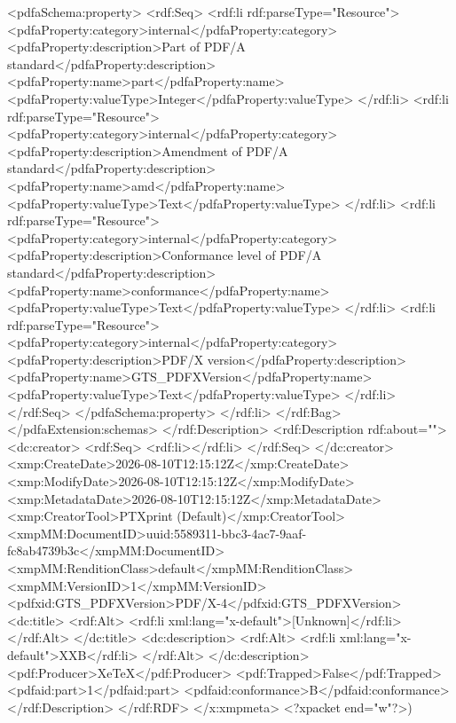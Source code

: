 {              <pdfaSchema:property>
                <rdf:Seq>
                  <rdf:li rdf:parseType="Resource">
                    <pdfaProperty:category>internal</pdfaProperty:category>
                    <pdfaProperty:description>Part of PDF/A standard</pdfaProperty:description>
                    <pdfaProperty:name>part</pdfaProperty:name>
                    <pdfaProperty:valueType>Integer</pdfaProperty:valueType>
                  </rdf:li>
                  <rdf:li rdf:parseType="Resource">
                    <pdfaProperty:category>internal</pdfaProperty:category>
                    <pdfaProperty:description>Amendment of PDF/A standard</pdfaProperty:description>
                    <pdfaProperty:name>amd</pdfaProperty:name>
                    <pdfaProperty:valueType>Text</pdfaProperty:valueType>
                  </rdf:li>
                  <rdf:li rdf:parseType="Resource">
                    <pdfaProperty:category>internal</pdfaProperty:category>
                    <pdfaProperty:description>Conformance level of PDF/A standard</pdfaProperty:description>
                    <pdfaProperty:name>conformance</pdfaProperty:name>
                    <pdfaProperty:valueType>Text</pdfaProperty:valueType>
                  </rdf:li>
                  <rdf:li rdf:parseType="Resource">
                    <pdfaProperty:category>internal</pdfaProperty:category>
                    <pdfaProperty:description>PDF/X version</pdfaProperty:description>
                    <pdfaProperty:name>GTS_PDFXVersion</pdfaProperty:name>
                    <pdfaProperty:valueType>Text</pdfaProperty:valueType>
                  </rdf:li>
                </rdf:Seq>
              </pdfaSchema:property>
            </rdf:li>
          </rdf:Bag>
        </pdfaExtension:schemas>
      </rdf:Description>
      <rdf:Description rdf:about="">
        <dc:creator>
          <rdf:Seq>
            <rdf:li></rdf:li>
          </rdf:Seq>
        </dc:creator>
        <xmp:CreateDate>2026-08-10T12:15:12Z</xmp:CreateDate>
        <xmp:ModifyDate>2026-08-10T12:15:12Z</xmp:ModifyDate>
        <xmp:MetadataDate>2026-08-10T12:15:12Z</xmp:MetadataDate>
        <xmp:CreatorTool>PTXprint (Default)</xmp:CreatorTool>
        <xmpMM:DocumentID>uuid:5589311-bbc3-4ac7-9aaf-fc8ab4739b3c</xmpMM:DocumentID>
        <xmpMM:RenditionClass>default</xmpMM:RenditionClass>
        <xmpMM:VersionID>1</xmpMM:VersionID>
        <pdfxid:GTS_PDFXVersion>PDF/X-4</pdfxid:GTS_PDFXVersion>
        <dc:title>
          <rdf:Alt>
            <rdf:li xml:lang="x-default">[Unknown]</rdf:li>
          </rdf:Alt>
        </dc:title>
        <dc:description>
          <rdf:Alt>
            <rdf:li xml:lang="x-default">XXB</rdf:li>
          </rdf:Alt>
        </dc:description>
        <pdf:Producer>XeTeX</pdf:Producer>
        <pdf:Trapped>False</pdf:Trapped>
      <pdfaid:part>1</pdfaid:part>
      <pdfaid:conformance>B</pdfaid:conformance>
      </rdf:Description>
  </rdf:RDF>
</x:xmpmeta>
<?xpacket end="w"?>)}
